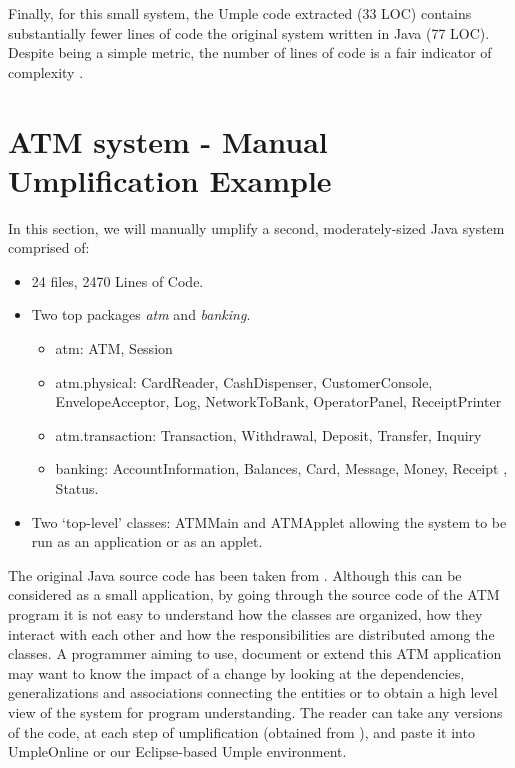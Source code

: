 Finally, for this small system, the Umple code extracted (33 LOC) contains substantially fewer lines of code the original system written in Java (77 LOC). Despite being a simple metric, the number of lines of code is a fair indicator of complexity \cite{LOCMetric}. 

\section{ATM system - Manual Umplification Example}

In this section, we will manually umplify a second, moderately-sized Java system comprised of:

\begin{itemize}
 \item 24 files, 2470 Lines of Code.
 \item Two top packages \textit{atm} and \textit{banking}.
	\begin{itemize}
	 \item atm: ATM, Session
	 \item atm.physical: CardReader, CashDispenser, CustomerConsole, EnvelopeAcceptor, Log, NetworkToBank, OperatorPanel, ReceiptPrinter
	 \item atm.transaction: Transaction, Withdrawal, Deposit, Transfer, Inquiry
	 \item banking: AccountInformation, Balances, Card, Message, Money, Receipt , Status.
	\end{itemize}
 \item Two `top-level' classes: ATMMain and ATMApplet allowing the system to be run as an application or as an applet.
\end{itemize}

The original Java source code has been taken from \cite{atmsystem}. Although this can be considered as a small application, by going through the source code of the ATM program it is not easy to understand how the classes are organized, how they interact with each other and how the responsibilities are distributed among the classes. A programmer aiming to use, document or extend this ATM application may want to know the impact of a change by looking at the dependencies, generalizations and associations connecting the entities or to obtain a high level view of the system for program understanding. The reader can take any versions of the code, at each step of umplification (obtained from \cite{UmplificationBasicExampleURL}), and paste it into UmpleOnline \cite{UmpleOnline} or our Eclipse-based Umple environment. 

